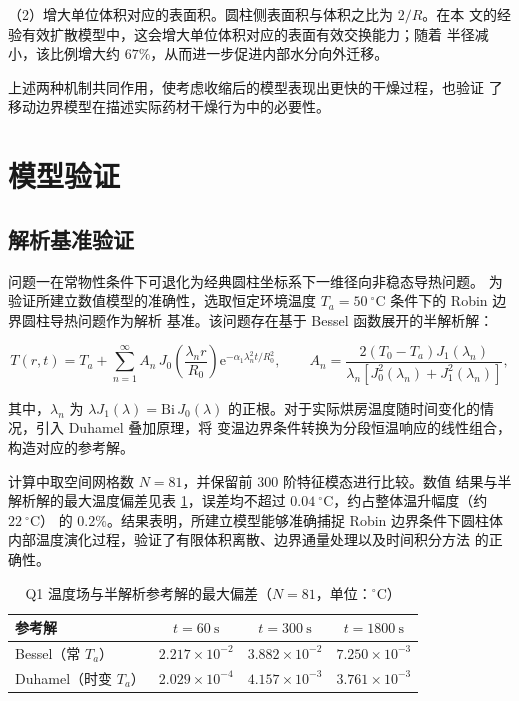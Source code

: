 \documentclass[withoutpreface,bwprint]{cumcmthesis}
\begin{document}
（2）增大单位体积对应的表面积。圆柱侧表面积与体积之比为 $2/R$。在本
文的经验有效扩散模型中，这会增大单位体积对应的表面有效交换能力；随着
半径减小，该比例增大约 $67\%$，从而进一步促进内部水分向外迁移。

上述两种机制共同作用，使考虑收缩后的模型表现出更快的干燥过程，也验证
了移动边界模型在描述实际药材干燥行为中的必要性。

\section{模型验证}

\subsection{解析基准验证}

问题一在常物性条件下可退化为经典圆柱坐标系下一维径向非稳态导热问题。
为验证所建立数值模型的准确性，选取恒定环境温度
$T_a=50\ ^\circ\mathrm{C}$ 条件下的 Robin 边界圆柱导热问题作为解析
基准。该问题存在基于 Bessel 函数展开的半解析解：

\begin{equation}
  T(r,t)=T_a+\sum_{n=1}^{\infty}A_n\,J_0\!\left(\frac{\lambda_n r}{R_0}
  \right)\mathrm{e}^{-\alpha_1\lambda_n^2 t/R_0^2},\qquad
  A_n=\frac{2(T_0-T_a)J_1(\lambda_n)}
  {\lambda_n\left[J_0^2(\lambda_n)+J_1^2(\lambda_n)\right]},
  \label{eq:bessel}
\end{equation}

其中，$\lambda_n$ 为 $\lambda J_1(\lambda)=\mathrm{Bi}\,J_0(\lambda)$
的正根。对于实际烘房温度随时间变化的情况，引入 Duhamel 叠加原理，将
变温边界条件转换为分段恒温响应的线性组合，构造对应的参考解。

计算中取空间网格数 $N=81$，并保留前 $300$ 阶特征模态进行比较。数值
结果与半解析解的最大温度偏差见表 \ref{tab:bessel}，误差均不超过
$0.04\ ^\circ\mathrm{C}$，约占整体温升幅度（约 $22\ ^\circ\mathrm{C}$）
的 $0.2\%$。结果表明，所建立模型能够准确捕捉 Robin 边界条件下圆柱体
内部温度演化过程，验证了有限体积离散、边界通量处理以及时间积分方法
的正确性。

\begin{table}[htbp]
  \centering
  \setcounter{table}{7}
  \caption{Q1 温度场与半解析参考解的最大偏差（$N=81$，单位：$^\circ\mathrm{C}$）}
  \label{tab:bessel}
  \begin{tabular}{lccc}
  \toprule
  参考解 & $t=60\ \mathrm{s}$ & $t=300\ \mathrm{s}$ & $t=1800\ \mathrm{s}$ \\
  \midrule
  Bessel（常 $T_a$） & $2.217\times10^{-2}$ & $3.882\times10^{-2}$ &
  $7.250\times10^{-3}$ \\
  Duhamel（时变 $T_a$） & $2.029\times10^{-4}$ & $4.157\times10^{-3}$ &
  $3.761\times10^{-3}$ \\
  \bottomrule
  \end{tabular}
\end{table}
\end{document}
